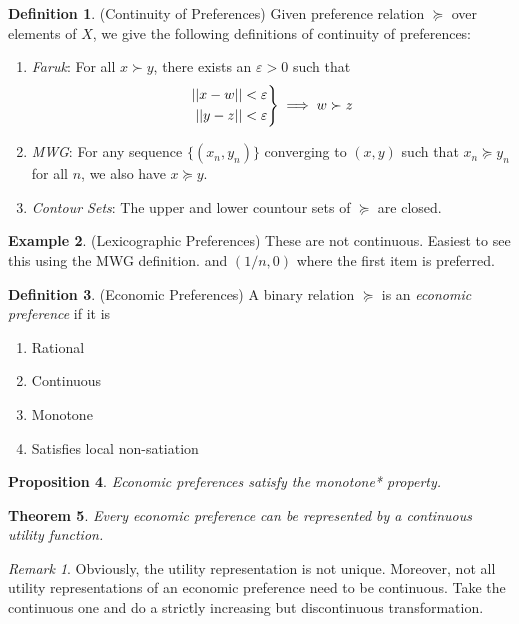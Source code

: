 \documentclass[12pt]{article}
\theoremstyle{plain}
\newtheorem{thm}{Theorem}[section]
\newtheorem{prop}[thm]{Proposition}
\theoremstyle{definition}
\newtheorem{defn}[thm]{Definition}
\newtheorem{ex}[thm]{Example}
\theoremstyle{remark}
\newtheorem*{rmk}{Remark}
\newenvironment{rcases}
  {\left.\begin{aligned}}
  {\end{aligned}\right\rbrace}
\begin{document}
\begin{defn}(Continuity of Preferences)
Given preference relation $\succeq$ over elements of $X$, we give the
following definitions of continuity of preferences:
\begin{enumerate}
  \item \emph{Faruk}: For all $x\succ y$, there exists an
    $\varepsilon>0$ such that
    \begin{align*}
      \begin{rcases}
      ||x-w||<\varepsilon \\
      ||y-z||<\varepsilon
      \end{rcases}
      \implies
      w \succ z
    \end{align*}
  \item \emph{MWG}: For any sequence $\{(x_n,y_n)\}$
    converging to $(x,y)$ such that $x_n\succeq y_n$ for all $n$, we
    also have $x\succeq y$.
  \item \emph{Contour Sets}: The upper and lower countour sets of
    $\succeq$ are closed.
\end{enumerate}
\end{defn}

\begin{ex}(Lexicographic Preferences)
These are not continuous. Easiest to see this using the MWG definition.
and $(1/n,0)$ where the first item is preferred.
\end{ex}

\begin{defn}(Economic Preferences)
A binary relation $\succeq$ is an \emph{economic preference} if it is
\begin{enumerate}
  \item Rational
  \item Continuous
  \item Monotone
  \item Satisfies local non-satiation
\end{enumerate}
\end{defn}

\begin{prop}
Economic preferences satisfy the monotone* property.
\end{prop}

\begin{thm}
Every economic preference can be represented by a continuous utility
function.
\end{thm}
\begin{rmk}
Obviously, the utility representation is not unique. Moreover,
not all utility representations of an economic preference need to be
continuous. Take the continuous one and do a strictly increasing but
discontinuous transformation.
\end{rmk}
\end{document}
